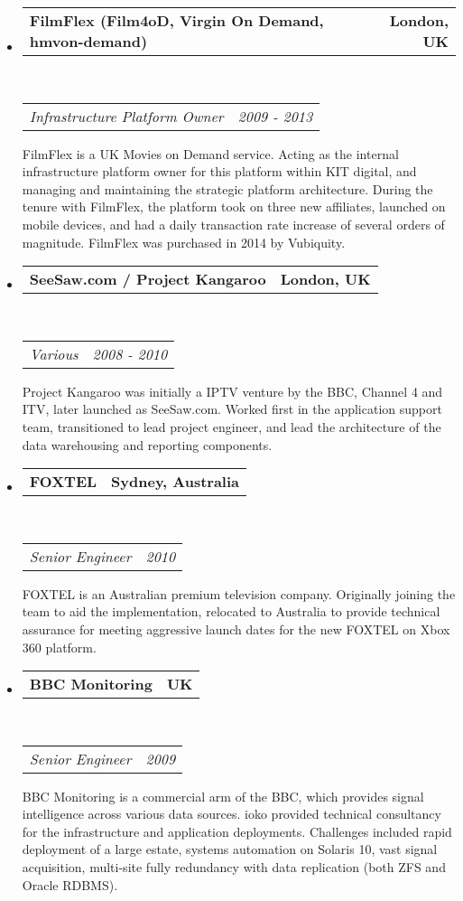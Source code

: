 \documentclass[10pt,a4paper]{article}
\makeatletter
\newcommand{\headerrow}[2]
{\begin{tabular*}{\linewidth}{l@{\extracolsep{\fill}}r}
    #1 &
    #2 \\
\end{tabular*}}
\makeatother
\begin{document}
\begin{itemize}
\begin{itemize}
            \item 
            \headerrow
                {\textbf{FilmFlex (Film4oD, Virgin On Demand, hmvon-demand)}}
                {\textbf{London, UK}}
            \\
            \headerrow
                {\emph{Infrastructure Platform Owner}}
                {\emph{2009 - 2013}}
                FilmFlex is a UK Movies on Demand service. Acting as the internal infrastructure platform owner for this platform within KIT digital, and managing and maintaining the strategic platform architecture. During the tenure with FilmFlex, the platform took on three new affiliates, launched on mobile devices, and had a daily transaction rate increase of several orders of magnitude. FilmFlex was purchased in 2014 by Vubiquity.
            \item 
            \headerrow
                {\textbf{SeeSaw.com / Project Kangaroo}}
                {\textbf{London, UK}}
            \\
            \headerrow
                {\emph{Various}}
                {\emph{2008 - 2010}}
                Project Kangaroo was initially a IPTV venture by the BBC, Channel 4 and ITV, later launched as SeeSaw.com. Worked first in the application support team, transitioned to lead project engineer, and lead the architecture of the data warehousing and reporting components.
            \item 
            \headerrow
                {\textbf{FOXTEL}}
                {\textbf{Sydney, Australia}}
            \\
            \headerrow
                {\emph{Senior Engineer}}
                {\emph{2010}}
                FOXTEL is an Australian premium television company. Originally joining the team to aid the implementation, relocated to Australia to provide technical assurance for meeting aggressive launch dates for the new FOXTEL on Xbox 360 platform.
            \item 
            \headerrow
                {\textbf{BBC Monitoring}}
                {\textbf{UK}}
            \\
            \headerrow
                {\emph{Senior Engineer}}
                {\emph{2009}}
                BBC Monitoring is a commercial arm of the BBC, which provides signal intelligence across various data sources. ioko provided technical consultancy for the infrastructure and application deployments. Challenges included rapid deployment of a large estate, systems automation on Solaris 10, vast signal acquisition, multi-site fully redundancy with data replication (both ZFS and Oracle RDBMS).
        \end{itemize}


\end{itemize}
\end{document}
